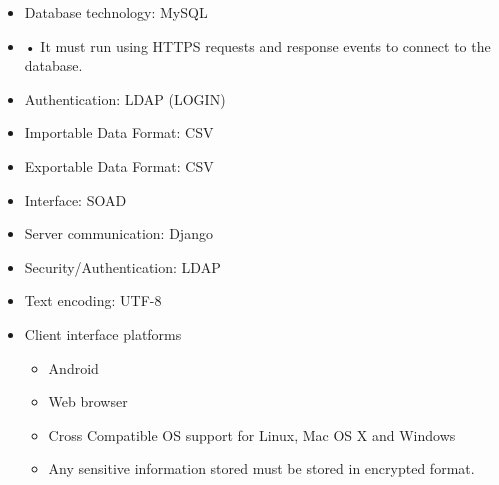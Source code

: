 \documentclass[10pt,a4paper]{article}
\begin{document}
        \begin{itemize}
                \item Database technology: MySQL
        \end{itemize}
                \begin{itemize}
                        \item • It must run using HTTPS requests and response events to connect to the database.
                \end{itemize}
                \begin{itemize}
                        \item Authentication: LDAP (LOGIN)                 
                                \end{itemize}
                \begin{itemize}
                        \item Importable Data Format: CSV
                \end{itemize}
                \begin{itemize}
                        \item Exportable Data Format: CSV
                \end{itemize}
                \begin{itemize}
                        \item Interface: SOAD
                \end{itemize}
                \begin{itemize}
                        \item Server communication: Django
                \end{itemize}
                \begin{itemize}
                        \item Security/Authentication: LDAP
                \end{itemize}
                \begin{itemize}
                        \item Text encoding: UTF-8
                \end{itemize}
                \begin{itemize}
                        \item Client interface platforms
                                                        \begin{itemize}
                                                                \item Android
                                                                \item Web browser
                                                                \item Cross Compatible OS support for Linux, Mac OS X and Windows
                                                                \item Any sensitive information stored must be stored in encrypted format.
                                                        \end{itemize}                                           
                \end{itemize}                                           
\end{document}
